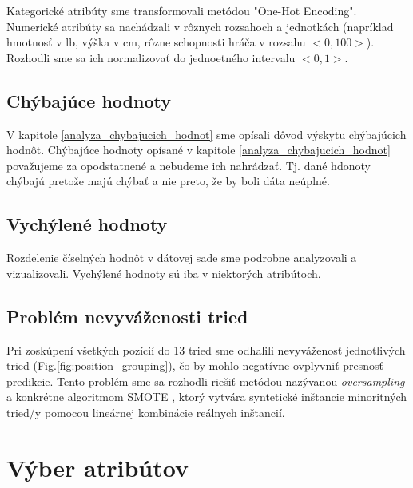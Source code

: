 \documentclass[runningheads]{llncs}
\begin{document}
Kategorické atribúty sme transformovali metódou "One-Hot Encoding". Numerické atribúty sa nachádzali v rôznych rozsahoch a jednotkách (napríklad hmotnosť v lb, výška v cm, rôzne schopnosti hráča v rozsahu $<0,100>$). Rozhodli sme sa ich normalizovať do jednoetného intervalu $<0,1>$.

\subsection{Chýbajúce hodnoty}

V kapitole \ref{analyza_chybajucich_hodnot} sme opísali dôvod výskytu chýbajúcich hodnôt. Chýbajúce hodnoty opísané v kapitole \ref{analyza_chybajucich_hodnot} považujeme za opodstatnené a nebudeme ich nahrádzať. Tj. dané hdonoty chýbajú pretože majú chýbať a nie preto, že by boli dáta neúplné.

\subsection{Vychýlené hodnoty}

Rozdelenie číselných hodnôt v dátovej sade sme podrobne analyzovali a vizualizovali. Vychýlené hodnoty sú iba v niektorých atribútoch. 

\subsection{Problém nevyváženosti tried \label{class_imbalance_problem}}

Pri zoskúpení všetkých pozícií do 13 tried sme odhalili nevyváženosť jednotlivých tried (Fig.\ref{fig:position_grouping}), čo by mohlo negatívne ovplyvniť presnosť predikcie. Tento problém sme sa rozhodli riešiť metódou nazývanou \textit{oversampling} a konkrétne algoritmom SMOTE \cite{AlbertoFernandez2018}, ktorý vytvára syntetické inštancie minoritných tried/y pomocou lineárnej kombinácie reálnych inštancií.

\section{Výber atribútov}
\end{document}
